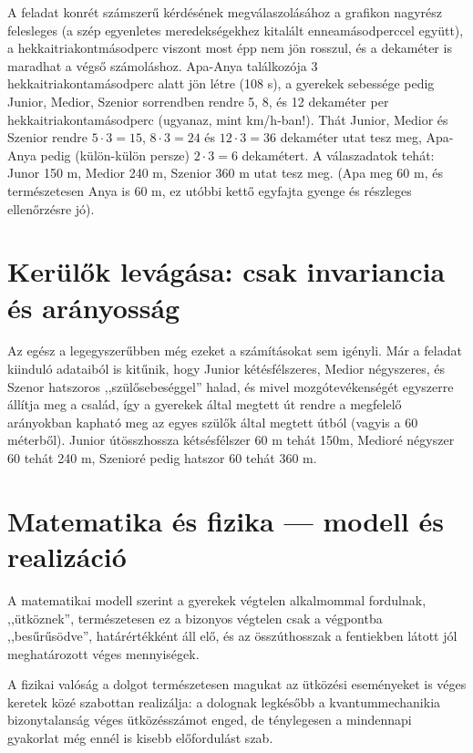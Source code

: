 \documentclass{article}
\begin{document}
	A feladat konrét számszerű kérdésének megválaszolásához  a grafikon nagyrész felesleges (a szép egyenletes meredekségekhez kitalált enneamásodperccel együtt), a hekkaitriakontmásodperc viszont most épp nem jön rosszul, és a dekaméter is maradhat a végső számoláshoz. Apa-Anya találkozója 3 hekkaitriakontamásodperc alatt jön létre (108 s), a gyerekek sebessége pedig Junior, Medior, Szenior sorrendben rendre 5, 8, és 12 dekaméter per hekkai\-triakonta\-másodperc (ugyanaz, mint km/h-ban!). Thát Junior, Medior és Szenior rendre $5\cdot3 = 15$, $8\cdot3 = 24$ és $12\cdot3 = 36$ dekaméter utat tesz meg, Apa-Anya pedig (külön-külön persze) $2\cdot3 = 6$ dekamétert. A válaszadatok tehát: Junor 150 m, Medior  240 m, Szenior 360 m utat tesz meg. (Apa meg 60 m, és természetesen Anya is 60 m, ez utóbbi kettő egyfajta gyenge és részleges ellenőrzésre jó).

	\section{Kerülők levágása: csak invariancia és arányosság}

	Az egész a legegyszerűbben még ezeket a számításokat sem igényli. Már a feladat kiinduló adataiból is kitűnik, hogy Junior kétésfélszeres, Medior négyszeres, és Szenor hatszoros ,,szülősebeséggel'' halad, és mivel mozgótevékenségét egyszerre állítja meg a család, így a gyerekek által megtett út rendre a megfelelő arányokban kapható meg az egyes szülők által megtett útból (vagyis a 60 méterből). Junior útösszhossza kétsésfélszer 60 m tehát 150m, Medioré négyszer 60 tehát 240 m, Szenioré pedig hatszor 60 tehát 360 m.


	\section{Matematika és fizika --- modell és realizáció}

	A matematikai modell szerint a gyerekek végtelen alkalmommal fordulnak, ,,ütköznek'', természetesen ez a bizonyos végtelen csak a végpontba ,,besűrűsödve'', határértékként áll elő, és az összúthosszak a fentiekben látott jól meghatározott véges mennyiségek.

	A fizikai valóság a dolgot természetesen magukat az ütközési eseményeket is véges keretek közé szabottan realizálja: a dolognak legkésőbb a kvantummechanikia bizonytalanság véges ütközésszámot enged, de ténylegesen a mindennapi gyakorlat még ennél is kisebb előfordulást szab. 
\end{document}
